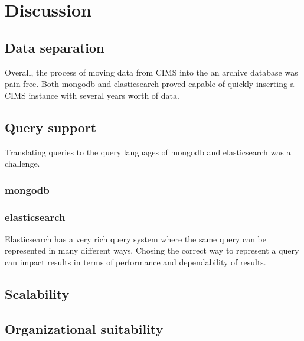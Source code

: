 \chapter{Discussion}
\label{chap:discussion}

\section{Data separation}
Overall, the process of moving data from CIMS into the an archive database was pain free. Both mongodb and elasticsearch proved capable of quickly inserting a CIMS instance with several years worth of data. 

\section{Query support}
Translating queries to the query languages of mongodb and elasticsearch was a challenge.

\subsection{mongodb}

\subsection{elasticsearch}
Elasticsearch has a very rich query system where the same query can be represented in many different ways. Chosing the correct way to represent a query can impact results in terms of performance and dependability of results. 

\section{Scalability}

\section{Organizational suitability}
